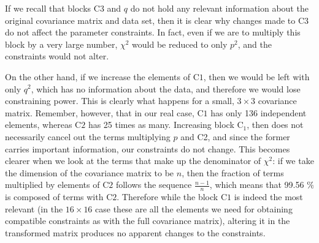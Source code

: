 If we recall that blocks $\mathrm{C3}$ and $q$ do not hold any relevant information about the original covariance matrix and data set, then it is clear why changes made to $\mathrm{C3}$ do not affect the parameter constraints. In fact, even if we are to multiply this block by a very large number, $\chi^2$ would be reduced to only $p^2$, and the constraints would not alter.

On the other hand, if we increase the elements of $\mathrm{C1}$, then we would be left with only $q^2$, which has no information about the data, and therefore we would lose constraining power. This is clearly what happens for a small, $3 \times 3$ covariance matrix. Remember, however, that in our real case, $\mathrm{C1}$ has only 136 independent elements, whereas $\mathrm{C2}$ has 25 times as many. Increasing block $\mathrm{C_1}$, then does not necessarily cancel out the terms multiplying $p$ and C2, and since the former carries important information, our constraints do not change. This becomes clearer when we look at the terms that make up the denominator of $\chi^2$: if we take the dimension of the covariance matrix to be $n$, then the fraction of terms multiplied by elements of $\mathrm{C2}$ follows the sequence $\frac{n-1}{n}$, which means that 99.56 $\%$ is composed of terms with $\mathrm{C2}$. Therefore while the block $\mathrm{C1}$ is indeed the most relevant (in the $16 \times 16$ case these are all the elements we need for obtaining compatible constraints as with the full covariance matrix), altering it in the transformed matrix produces no apparent changes to the constraints.
	
	
	
	
	
	
	
	
	
